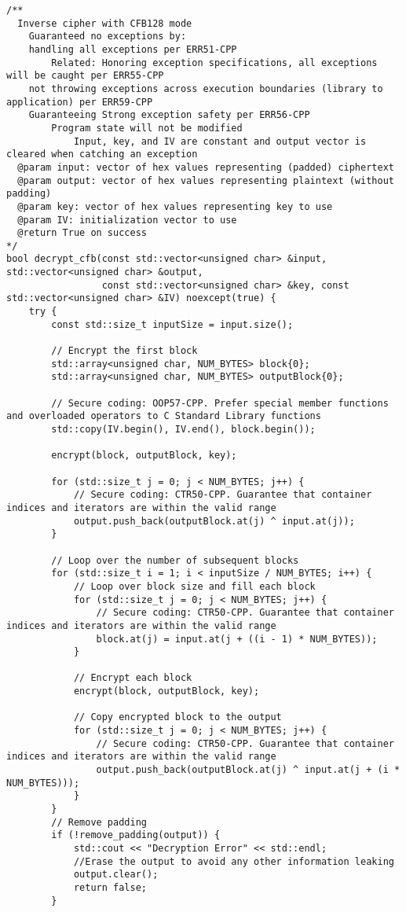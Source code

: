 \documentclass[a4paper,12pt]{article}
\begin{document}
{\begin{lstlisting}
/**
  Inverse cipher with CFB128 mode
    Guaranteed no exceptions by:
    handling all exceptions per ERR51-CPP
        Related: Honoring exception specifications, all exceptions will be caught per ERR55-CPP
    not throwing exceptions across execution boundaries (library to application) per ERR59-CPP
    Guaranteeing Strong exception safety per ERR56-CPP
        Program state will not be modified
            Input, key, and IV are constant and output vector is cleared when catching an exception
  @param input: vector of hex values representing (padded) ciphertext
  @param output: vector of hex values representing plaintext (without padding)
  @param key: vector of hex values representing key to use
  @param IV: initialization vector to use
  @return True on success
*/
bool decrypt_cfb(const std::vector<unsigned char> &input, std::vector<unsigned char> &output,
                 const std::vector<unsigned char> &key, const std::vector<unsigned char> &IV) noexcept(true) {
    try {
        const std::size_t inputSize = input.size();

        // Encrypt the first block
        std::array<unsigned char, NUM_BYTES> block{0};
        std::array<unsigned char, NUM_BYTES> outputBlock{0};

        // Secure coding: OOP57-CPP. Prefer special member functions and overloaded operators to C Standard Library functions
        std::copy(IV.begin(), IV.end(), block.begin());

        encrypt(block, outputBlock, key);

        for (std::size_t j = 0; j < NUM_BYTES; j++) {
            // Secure coding: CTR50-CPP. Guarantee that container indices and iterators are within the valid range
            output.push_back(outputBlock.at(j) ^ input.at(j));
        }

        // Loop over the number of subsequent blocks
        for (std::size_t i = 1; i < inputSize / NUM_BYTES; i++) {
            // Loop over block size and fill each block
            for (std::size_t j = 0; j < NUM_BYTES; j++) {
                // Secure coding: CTR50-CPP. Guarantee that container indices and iterators are within the valid range
                block.at(j) = input.at(j + ((i - 1) * NUM_BYTES));
            }

            // Encrypt each block
            encrypt(block, outputBlock, key);

            // Copy encrypted block to the output
            for (std::size_t j = 0; j < NUM_BYTES; j++) {
                // Secure coding: CTR50-CPP. Guarantee that container indices and iterators are within the valid range
                output.push_back(outputBlock.at(j) ^ input.at(j + (i * NUM_BYTES)));
            }
        }
        // Remove padding
        if (!remove_padding(output)) {
            std::cout << "Decryption Error" << std::endl;
            //Erase the output to avoid any other information leaking
            output.clear();
            return false;
        }


\end{lstlisting}}
\end{document}
